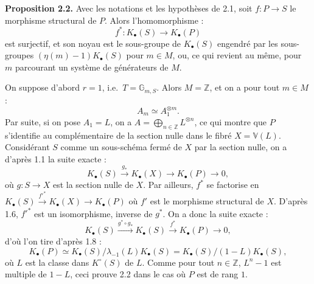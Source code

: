 \textbf{Proposition 2.2.} Avec les notations et les hypothèses de 2.1, soit $f:P\to S$ le morphisme structural de $P$. Alors l'homomorphisme :
\[
f^*:K_\bullet(S)\longrightarrow K_\bullet(P)
\]
est surjectif, et son noyau est le sous-groupe de $K_\bullet(S)$ engendré par les sous-groupes $(\eta(m)-1)K_\bullet(S)$ pour $m\in M$, ou, ce qui revient au même, pour $m$ parcourant un système de générateurs de $M$.

On suppose d'abord $r=1$, i.e.\ $T=\mathbb G_{m,S}$. Alors $M=\mathbb Z$, et on a pour tout $m\in M$ :
\[
A_m\simeq A_1^{\otimes m}.
\]
Par suite, si on pose $A_1=L$, on a $A=\bigoplus_{n\in\mathbb Z}L^{\otimes n}$, ce qui montre que $P$ s'identifie au complémentaire de la section nulle dans le fibré $X=\mathbb V(L)$. Considérant $S$ comme un sous-schéma fermé de $X$ par la section nulle, on a d'après 1.1 la suite exacte :
\[
K_\bullet(S)\xrightarrow{g_*}K_\bullet(X)\longrightarrow K_\bullet(P)\longrightarrow 0,
\]
où $g:S\to X$ est la section nulle de $X$. Par ailleurs, $f^*$ se factorise en \(K_\bullet(S)\xrightarrow{f'^*}K_\bullet(X)\longrightarrow K_\bullet(P)\) où $f'$ est le morphisme structural de $X$. D'après 1.6, $f'^*$ est un isomorphisme, inverse de $g^*$. On a donc la suite exacte :
\[
K_\bullet(S)\xrightarrow{g^*\circ g_*}K_\bullet(S)\xrightarrow{f^*}K_\bullet(P)\longrightarrow 0,
\]
d'où l'on tire d'après 1.8 :
\[
K_\bullet(P)\simeq K_\bullet(S)/\lambda_{-1}(L)K_\bullet(S)=K_\bullet(S)/(1-L)K_\bullet(S),
\]
où $L$ est la classe dans $K^\circ(S)$ de $L$. Comme pour tout $n\in\mathbb Z$, $L^n-1$ est multiple de $1-L$, ceci prouve 2.2 dans le cas où $P$ est de rang $1$.

